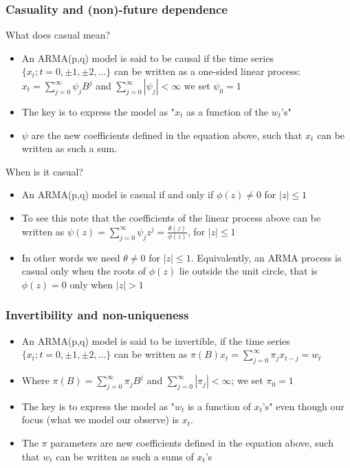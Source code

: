 \documentclass{article}
\begin{document}
\subsubsection{Casuality and (non)-future dependence}

What does casual mean?
\begin{itemize}
    \item An ARMA(p,q) model is said to be causal if the time series $\{ x_t;t=0,\pm1 ,\pm2, ...\}$ can be written as a one-sided linear process:
    \subitem $x_t = \sum_{j=0}^\infty \psi_j B^j$ and $\sum_{j=0}^\infty |\psi_j| < \infty$ we set $\psi_0 = 1$
    \item The key is to express the model as "$x_t$ as a function of the $w_t$'s"
    \item $\psi$ are the new coefficients defined in the equation above, such that $x_t$ can be written as such a sum.
\end{itemize}

\noindent When is it casual?
\begin{itemize}
    \item An ARMA(p,q) model is casual if and only if $\phi(z) \neq 0$ for $|z| \leq 1$
    \item To see this note that the coefficients of the linear process above can be written as $\psi(z) = \sum_{j=0}^\infty \psi_j z^j = \frac{\theta(z)}{\phi(z)}$, for $|z| \leq 1$
    \item In other words we need $\theta \neq 0$ for $|z| \leq 1$. Equivalently, an ARMA process is casual only when the roots of $\phi(z)$ lie outside the unit circle, that is $\phi(z) = 0$ only when $|z| > 1$
\end{itemize}


\subsubsection{Invertibility and non-uniqueness}
\begin{itemize}
    \item An ARMA(p,q) model is said to be invertible, if the time series $\{ x_t;t=0,\pm1 ,\pm2, ...\}$ can be written as
    \subitem $\pi(B) x_t = \sum_{j=0}^\infty \pi_j x_{t-j} = w_t$
    \item Where $\pi(B) = \sum_{j=0}^\infty \pi_j B^j$ and $\sum_{j=0}^\infty |\pi_j| < \infty$; we set $\pi_0 = 1$
    \item The key is to express the model as "$w_t$ is a function of $x_t$'s" even though our focus (what we model our observe) is $x_t$.
    \item The $\pi$ parameters are new coefficients defined in the equation above, such that $w_t$ can be written as such a sums of $x_t$'s
\end{itemize}
\end{document}
